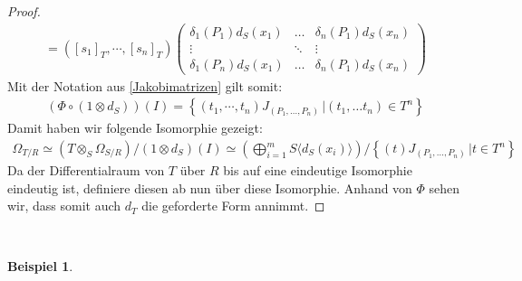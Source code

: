 \documentclass[10pt,a4paper]{report}
\newcounter{Aussage}[chapter]
\newtheorem{bsp}[Aussage]{Beispiel}
\newcommand{\divR}[2]{\Omega_{#1/#2}}
\newcommand{\divf}[1]{d_{#1}}
\newcommand{\Tensor}[3]{#1 \otimes_{#2} #3}
\newcommand{\tensor}[3]{#1 \otimes #3}
\begin{document}
\begin{proof}
\begin{gather*}
=
([s_1]_T , \cdots , [s_n]_T)
\begin{pmatrix}
\delta_1(P_1) \divf{S}(x_1) & \dots & \delta_n(P_1) \divf{S}(x_n)\\
\vdots & \ddots & \vdots \\
\delta_1(P_n) \divf{S}(x_1) & \dots & \delta_n(P_1) \divf{S}(x_n)
\end{pmatrix}
\end{gather*}
Mit der Notation aus \cref{Jakobimatrizen} gilt somit:
\begin{gather*}
(\Phi \circ (\tensor{1}{S}{\divf{S}}))(I) = \left\lbrace (t_1, \cdots, t_n) J_{(P_1,\dots, P_n)} \, \vert (t_1 , \dots t_n) \in T^n \right\rbrace
\end{gather*}
Damit haben wir folgende Isomorphie gezeigt:
\begin{gather*}
\divR{T}{R} 
\simeq (\Tensor{T}{S}{\divR{S}{R}}) / (\tensor{1}{S}{d_{S}})(I) 
\simeq \left( \bigoplus_{i =1}^m S \langle \divf{S}(x_i) \rangle \right) / \left\lbrace (t) J_{(P_1,\dots, P_n)} \, \vert t \in T^n \right\rbrace
\end{gather*}
Da der Differentialraum von $T$ über $R$ bis auf eine eindeutige Isomorphie eindeutig ist, definiere diesen ab nun über diese Isomorphie. Anhand von $\Phi$ sehen wir, dass somit auch $\divf{T}$ die geforderte Form annimmt.
\end{proof}


\ \\
\begin{bsp}
\end{bsp}
\end{document}
